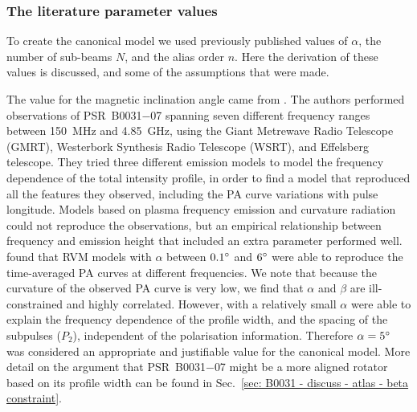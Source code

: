 




\subsubsection{The literature parameter values}
\label{sec: B0031 - discuss - canonical model - literature values}

To create the canonical model we used previously published values of $\alpha$, the number of sub-beams $N$, and the alias order $n$. Here the derivation of these values is discussed, and some of the assumptions that were made.

The value for the magnetic inclination angle came from \citet{SMS+2007}. The authors performed observations of PSR~B0031$-$07 spanning seven different frequency ranges between 150~MHz and 4.85~GHz, using the Giant Metrewave Radio Telescope (GMRT), Westerbork Synthesis Radio Telescope (WSRT), and Effelsberg telescope. They tried three different emission models to model the frequency dependence of the total intensity profile, in order to find a model that reproduced all the features they observed, including the PA curve variations with pulse longitude. Models based on plasma frequency emission and curvature radiation could not reproduce the observations, but an empirical relationship between frequency and emission height that included an extra parameter \citep{Txxx1991} performed well. \citet{SMS+2007} found that RVM models with $\alpha$ between $0.1^\circ$ and $6^\circ$ were able to reproduce the time-averaged PA curves at different frequencies. We note that because the curvature of the observed PA curve is very low, we find that $\alpha$ and $\beta$ are ill-constrained and highly correlated. However, with a relatively small $\alpha$ \citet{SMS+2007} were able to explain the frequency dependence of the profile width, and the spacing of the subpulses ($P_2$), independent of the polarisation information. Therefore $\alpha = 5^\circ$ was considered an appropriate and justifiable value for the canonical model. More detail on the argument that PSR~B0031$-$07 might be a more aligned rotator based on its profile width can be found in Sec.~\ref{sec: B0031 - discuss - atlas - beta constraint}.


